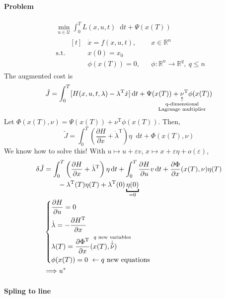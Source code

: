 \documentclass[letterpaper,12pt,titlepage]{report}
\newcommand*\dif{\mathop{}\!\mathrm{d}}
\newcommand{\trans}{^\text{T}}
\newcommand*\pder[2]{\frac{\partial #1}{\partial #2}}
\newcommand*\R{\mathbb{R}}
\theoremstyle{plain}
\theoremstyle{definition}
\begin{document}
\paragraph{Problem}
\begin{align}
  & \min_{u\in\mathcal U} \int_0^T L(x,u,t)\dif t + \Psi(x(T)) \\
  & \text{s.t. } \begin{aligned}[t]
    & \dot x = f(x,u,t), && x\in\R^n \\
    & x(0) = x_0 \\
    & \phi(x(T)) = 0, && \phi:\R^n\to\R^q,\ q\le n
  \end{aligned}
\end{align}
The augmented cost is
\[
  \tilde J = \int_0^T [ H(x,u,t,\lambda) - \lambda\trans \dot x]\dif t + \Psi(x(T)) + \underset{\mathclap{\substack{\uparrow\\ \text{q-dimensional}\\ \text{Lagrange multiplier}}}}{\nu}\trans \phi(x(T))
\]
Let $\Phi(x(T),\nu)=\Psi(x(T)) + \nu\trans\phi(x(T))$. Then,
\[
  \tilde J = \int_0^T \left( \pder{H}{x} + \dot\lambda\trans \right) \eta \dif t + \Phi(x(T),\nu)
\]
We know how to solve this! With $u\mapsto u+\varepsilon v$, $x\mapsto x+\varepsilon\eta + o(\varepsilon)$,
\begin{align}
  \delta \tilde J &= \int_0^T \left(\pder{H}{x} + \dot\lambda\trans\right)\eta\dif t + \int_0^T \pder{H}{u}v \dif t + \pder{\Phi}{x}(x(T),\nu)\eta(T) \\
                  & \qquad - \lambda\trans(T)\eta(T) + \lambda\trans(0)\underbracket{\eta(0)}_{=0} \\
                  & \begin{dcases}
                    \pder{H}{u} = 0 \\
                    \dot\lambda = -\pder{H\trans}{x} \\
                    \lambda(T) = \pder{\Phi\trans}{x}( x(T), \overset{\mathclap{\substack{q \text{ new variables}\\ \downarrow}}}{\nu} ) \\
                    \phi(x(T)) = 0 \ \leftarrow q \text{ new equations}
                  \end{dcases} \\
                  & \Longrightarrow u^*
\end{align}

\paragraph{Spling to line}
\end{document}
